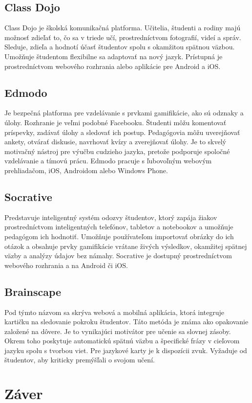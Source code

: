 \documentclass{article}
\begin{document}
\subsection {Class Dojo}
Class Dojo je školská komunikačná platforma. Učitelia, študenti a rodiny majú možnosť zdieľať to, čo sa v triede učí, prostredníctvom fotografií, videí a správ. Sleduje, zdieľa a hodnotí účasť študentov spolu s okamžitou spätnou väzbou. Umožňuje študentom flexibilne sa adaptovať na nový jazyk. Prístupná je prostredníctvom webového rozhrania alebo aplikácie pre Android a iOS\cite{hlavnyclanok}.
\subsection {Edmodo}
Je bezpečná platforma pre vzdelávanie s prvkami gamifikácie, ako sú odznaky a úlohy. Rozhranie je veľmi podobné Facebooku. Študenti môžu komentovať príspevky, zadávať úlohy a sledovať ich postup. Pedagógovia môžu uverejňovať ankety, otvárať diskusie, navrhovať kvízy a zverejňovať úlohy. Je to skvelý motivačný nástroj pre výučbu cudzieho jazyka, pretože podporuje spoločné vzdelávanie a tímovú prácu. Edmodo pracuje s ľubovoľným webovým prehliadačom, iOS, Androidom alebo Windows Phone\cite{hlavnyclanok}.
\subsection {Socrative}
Predstavuje inteligentný systém odozvy študentov, ktorý zapája žiakov prostredníctvom inteligentných telefónov, tabletov a notebookov a umožňuje pedagógom ich hodnotiť. Umožňuje používateľom importovať obrázky do ich otázok a obsahuje prvky gamifikácie vrátane živých výsledkov, okamžitej spätnej väzby a analýzy údajov bez námahy. Socrative je dostupný prostredníctvom webového rozhrania a na Android či iOS\cite{hlavnyclanok}.
\subsection {Brainscape}\label{posledna_aplikacia}
Pod týmto názvom sa skrýva webová a mobilná aplikácia, ktorá integruje kartičku na sledovanie pokroku študentov. Táto metóda je známa ako opakovanie založené na dôvere. Je to vynikajúci motivátor pre učenie sa slovnej zásoby. Okrem toho poskytuje automatickú spätnú väzbu a špecifické frázy v cieľovom jazyku spolu s tvorbou viet. Pre jazykové karty je k dispozícii zvuk. Vyžaduje od študentov, aby kriticky premýšľali o svojom učení\cite{hlavnyclanok}.

\section* {Záver}\label{zaver}
\end{document}
